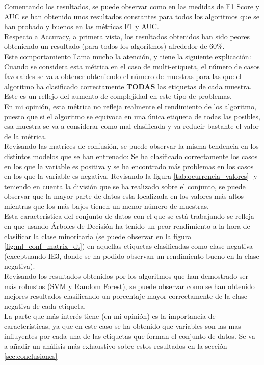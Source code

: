 Comentando los resultados, se puede observar como en las medidas de F1 Score y AUC se han obtenido unos resultados constantes para todos los algoritmos que se han probado y buenos en las métricas F1 y AUC.\\
\linebreak
Respecto a Accuracy, a primera vista, los resultados obtenidos han sido peores obteniendo un resultado (para todos los algoritmos) alrededor de 60\%.\\
Este comportamiento llama mucho la atención, y tiene la siguiente explicación: Cuando se considera esta métrica en el caso de multi-etiqueta, el número de casos favorables se va a obtener obteniendo el número de muestras para las que el algoritmo ha clasificado correctamente \textbf{TODAS} las etiquetas de cada muestra.\\ Este es un reflejo del aumento de complejidad en este tipo de problemas.\\
\linebreak
En mi opinión, esta métrica no refleja realmente el rendimiento de los algoritmo, puesto que si el algoritmo se equivoca en una única etiqueta de todas las posibles, esa muestra se va a considerar como mal clasificada y va reducir bastante el valor de la métrica.\\
\linebreak
Revisando las matrices de confusión, se puede observar la misma tendencia en los distintos modelos que se han entrenado: Se ha clasificado correctamente los casos en los que la variable es positiva y se ha encontrado más problemas en los casos en los que la variable es negativa. Revisando la figura 	\ref{tab:ocurrencia_valores}- y teniendo en cuenta la división que se ha realizado sobre el conjunto, se puede observar que la mayor parte de datos esta localizada en los valores más altos mientras que los más bajos tienen un menor número de muestras.\\
Esta característica del conjunto de datos con el que se está trabajando se refleja en que usando Árboles de Decisión ha tenido un peor rendimiento a la hora de clasificar la clase minoritaria (se puede observar en la figura \ref{fig:ml_conf_matrix_dt}) en aquellas etiquetas clasificadas como clase negativa (exceptuando IE3, donde se ha podido observan un rendimiento bueno en la clase negativa).\\
Revisando los resultados obtenidos por los algoritmos que han demostrado ser más robustos (SVM y Random Forest), se puede observar como se han obtenido mejores resultados clasificando un porcentaje mayor correctamente de la clase negativa de cada etiqueta.\\
\linebreak
La parte que más interés tiene (en mi opinión) es la importancia de características, ya que en este caso se ha obtenido que variables son las mas influyentes por cada una de las etiquetas que forman el conjunto de datos. Se va a añadir un análisis más exhaustivo sobre estos resultados en la sección \ref{sec:conclusiones}-
\clearpage
